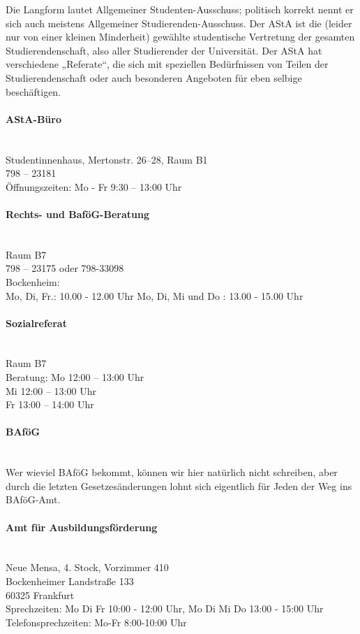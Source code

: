 Die Langform lautet Allgemeiner Studenten-Ausschuss; politisch korrekt nennt er sich auch meistens Allgemeiner Studierenden-Ausschuss. Der AStA ist die (leider nur von einer kleinen Minderheit) gewählte studentische Vertretung der gesamten Studierendenschaft, also aller Studierender der Universität. Der AStA hat verschiedene „Referate“, die sich mit speziellen Bedürfnissen von Teilen der Studierendenschaft oder auch besonderen Angeboten für eben selbige beschäftigen.

\paragraph{AStA-Büro}~\\
Studentinnenhaus, Mertonstr. 26–28, Raum B1\\
798 – 23181\\
Öffnungszeiten: Mo - Fr 9:30 -- 13:00 Uhr

\paragraph{Rechts- und BaföG-Beratung}~\\
Raum B7\\
798 – 23175 oder 798-33098\\
Bockenheim:\\
Mo, Di, Fr.: 10.00 - 12.00 Uhr
Mo, Di, Mi und Do : 13.00 - 15.00 Uhr


\paragraph{Sozialreferat}~\\
Raum B7\\
Beratung: Mo 12:00 -- 13:00 Uhr\\
Mi 12:00 -- 13:00 Uhr\\
Fr 13:00 -- 14:00 Uhr


\paragraph{BAföG}~\\
Wer wieviel BAföG bekommt, können wir hier natürlich nicht schreiben, aber durch die letzten Gesetzesänderungen lohnt sich eigentlich für Jeden der Weg ins BAföG-Amt.

\paragraph{Amt für Ausbildungsförderung}~\\
Neue Mensa, 4. Stock, Vorzimmer 410\\
Bockenheimer Landstraße 133\\
60325 Frankfurt\\
Sprechzeiten: Mo Di Fr 10:00 - 12:00 Uhr, Mo Di Mi Do 13:00 - 15:00 Uhr
Telefonsprechzeiten: Mo-Fr 8:00-10:00 Uhr\\

